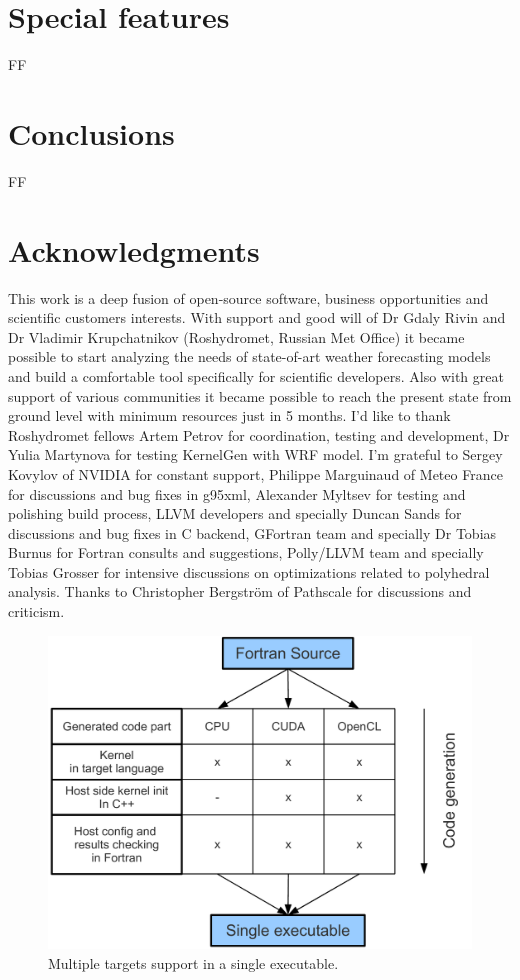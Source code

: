 \documentclass[a4,12pt]{article}
\begin{document}
\section{Special features}

FF

\section{Conclusions}

FF

\section{Acknowledgments}

This work is a deep fusion of open-source software, business opportunities and scientific customers interests. With support and good will of Dr Gdaly Rivin and Dr Vladimir Krupchatnikov (Roshydromet, Russian Met Office) it became possible to start analyzing the needs of state-of-art weather forecasting models and build a comfortable tool specifically for scientific developers. Also with great support of various communities it became possible to reach the present state from ground level with minimum resources just in 5 months. I'd like to thank Roshydromet fellows Artem Petrov for coordination, testing and development, Dr Yulia Martynova for testing KernelGen with WRF model. I'm grateful to Sergey Kovylov of NVIDIA for constant support, Philippe Marguinaud of Meteo France for discussions and bug fixes in g95xml, Alexander Myltsev for testing and polishing build process, LLVM developers and specially Duncan Sands for discussions and bug fixes in C backend, GFortran team and specially Dr Tobias Burnus for Fortran consults and suggestions, Polly/LLVM team and specially Tobias Grosser for intensive discussions on optimizations related to polyhedral analysis. Thanks to Christopher Bergström of Pathscale for discussions and criticism.

\begin{figure}
\centering
\includegraphics[scale=0.5]{figures/portability.pdf}
\caption{Multiple targets support in a single executable.}
\label{fig:portability}
\end{figure}
\end{document}
